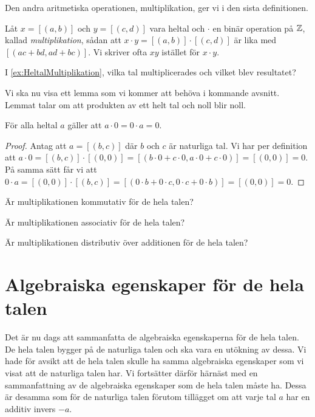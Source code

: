 Den andra aritmetiska operationen, multiplikation, ger vi i den sista
definitionen.
\begin{definition}[Multiplikation]
  Låt \(x=[(a,b)]\) och \(y=[(c,d)]\) vara heltal och \(\cdot\) en binär
  operation på \(\mathbb{Z}\), kallad \emph{multiplikation}, sådan att
  \(x\cdot y=[(a,b)]\cdot [(c,d)]\) är lika med \([(ac+bd,ad+bc)]\).
  Vi skriver ofta \(xy\) istället för \(x\cdot y\).
\end{definition}
\begin{exercise}
  I \cref{ex:HeltalMultiplikation}, vilka tal multiplicerades och vilket
  blev resultatet?
\end{exercise}

Vi ska nu visa ett lemma som vi kommer att behöva i kommande avsnitt.
Lemmat talar om att produkten av ett helt tal och noll blir noll.
\begin{lemma}\label{lem:IngenNolldelare}
  För alla heltal \(a\) gäller att \(a\cdot 0 = 0\cdot a = 0\).
\end{lemma}
\begin{proof}
  Antag att \(a = [(b,c)]\) där \(b\) och \(c\) är naturliga tal.
  Vi har per definition att \(a\cdot 0 = [(b,c)]\cdot [(0,0)] =
  [(b\cdot 0 + c\cdot 0, a\cdot 0 + c\cdot 0)] = [(0,0)] = 0\).
  På samma sätt får vi att \(0\cdot a = [(0,0)]\cdot [(b,c)] = [(0\cdot b +
  0\cdot c, 0\cdot c + 0\cdot b)] = [(0,0)] = 0\).
\end{proof}

\begin{exercise}
  Är multiplikationen kommutativ för de hela talen?
\end{exercise}
\begin{exercise}
  Är multiplikationen associativ för de hela talen?
\end{exercise}
\begin{exercise}
  Är multiplikationen distributiv över additionen för de hela talen?
\end{exercise}


\section{Algebraiska egenskaper för de hela talen}
\label{sec:HeltalensAlgebraiskaEgenskaper}
Det är nu dags att sammanfatta de algebraiska egenskaperna för de
hela talen.
De hela talen bygger på de naturliga talen och ska vara en utökning av dessa.
Vi hade för avsikt att de hela talen skulle ha samma algebraiska egenskaper som
vi visat att de naturliga talen har.
Vi fortsätter därför härnäst med en sammanfattning av de algebraiska egenskaper
som de hela talen måste ha.
Dessa är desamma som för de naturliga talen förutom tillägget om att varje tal
\(a\) har en additiv invers \(-a\).

